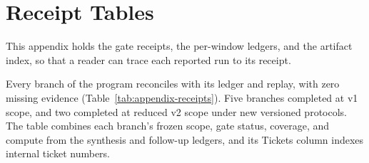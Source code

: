 \section{Receipt Tables}
\label{app:receipts}

This appendix holds the gate receipts, the per-window ledgers, and the artifact index, so that a reader can trace each reported run to its receipt.

Every branch of the program reconciles with its ledger and replay, with zero missing evidence (Table~\ref{tab:appendix-receipts}). Five branches completed at v1 scope, and two completed at reduced v2 scope under new versioned protocols. The table combines each branch's frozen scope, gate status, coverage, and compute from the synthesis and follow-up ledgers, and its Tickets column indexes internal ticket numbers.

